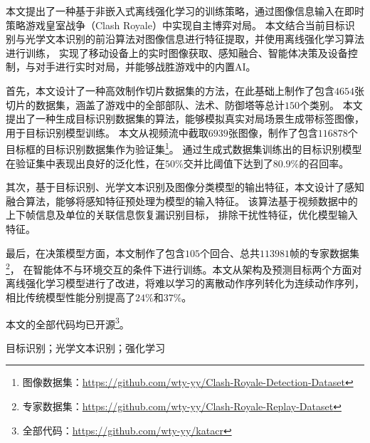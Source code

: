 
\clearpage
\titlespacing{\chapter}{0pt}{0mm}{5mm}


本文提出了一种基于非嵌入式离线强化学习的训练策略，通过图像信息输入在即时策略游戏皇室战争（Clash Royale）中实现自主博弈对局。
本文结合当前目标识别与光学文本识别的前沿算法对图像信息进行特征提取，并使用离线强化学习算法进行训练，
实现了移动设备上的实时图像获取、感知融合、智能体决策及设备控制，与对手进行实时对局，并能够战胜游戏中的内置AI。

首先，本文设计了一种高效制作切片数据集的方法，在此基础上制作了包含$4654$张切片的数据集，涵盖了游戏中的全部部队、法术、防御塔等总计$150$个类别。
本文提出了一种生成目标识别数据集的算法，能够模拟真实对局场景生成带标签图像，用于目标识别模型训练。
本文从视频流中截取$6939$张图像，制作了包含$116878$个目标框的目标识别数据集作为验证集\footnote{图像数据集：\url{https://github.com/wty-yy/Clash-Royale-Detection-Dataset}\hfill}。
通过生成式数据集训练出的目标识别模型在验证集中表现出良好的泛化性，在$50\%$交并比阈值下达到了$80.9\%$的召回率。

其次，基于目标识别、光学文本识别及图像分类模型的输出特征，本文设计了感知融合算法，能够将感知特征预处理为模型的输入特征。
该算法基于视频数据中的上下帧信息及单位的关联信息恢复漏识别目标，
排除干扰性特征，优化模型输入特征。

最后，在决策模型方面，本文制作了包含$105$个回合、总共$113981$帧的专家数据集\footnote{专家数据集：\url{https://github.com/wty-yy/Clash-Royale-Replay-Dataset}\hfill}，
在智能体不与环境交互的条件下进行训练。本文从架构及预测目标两个方面对离线强化学习模型进行了改进，将难以学习的离散动作序列转化为连续动作序列，
相比传统模型性能分别提高了$24\%$和$37\%$。

本文的全部代码均已开源\footnote{全部代码：\url{https://github.com/wty-yy/katacr}}。

\vspace{\baselineskip}
 目标识别；光学文本识别；强化学习



